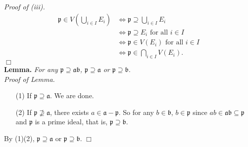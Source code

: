 \documentclass{article}
\begin{document}
\emph{Proof of (iii).}
\begin{align*}
\mathfrak{p} \in V\left( \bigcup_{i \in I}E_i \right)
&\Longleftrightarrow \mathfrak{p} \supseteq \bigcup_{i \in I}E_i \\
&\Longleftrightarrow \mathfrak{p} \supseteq E_i \text{ for all } i \in I \\
&\Longleftrightarrow \mathfrak{p} \in V(E_i) \text{ for all } i \in I \\
&\Longleftrightarrow \mathfrak{p} \in \bigcap_{i \in I} V(E_i).
\end{align*}
$\Box$ \\

\textbf{Lemma.}
\emph{For any $\mathfrak{p} \supseteq \mathfrak{a} \mathfrak{b}$,
$\mathfrak{p} \supseteq \mathfrak{a}$ or $\mathfrak{p} \supseteq \mathfrak{b}$.} \\

\emph{Proof of Lemma.}
\begin{enumerate}
\item[(1)] If $\mathfrak{p} \supseteq \mathfrak{a}$. We are done.
\item[(2)] If $\mathfrak{p} \not\supseteq \mathfrak{a}$,
there exists $a \in \mathfrak{a} - \mathfrak{p}$.
So for any $b \in \mathfrak{b}$, $b \in \mathfrak{p}$
since $ab \in \mathfrak{ab} \subseteq \mathfrak{p}$ and $\mathfrak{p}$ is a prime ideal,
that is, $\mathfrak{p} \supseteq \mathfrak{b}$.
\end{enumerate}
By (1)(2), $\mathfrak{p} \supseteq \mathfrak{a}$ or $\mathfrak{p} \supseteq \mathfrak{b}$.
$\Box$ \\
\end{document}
